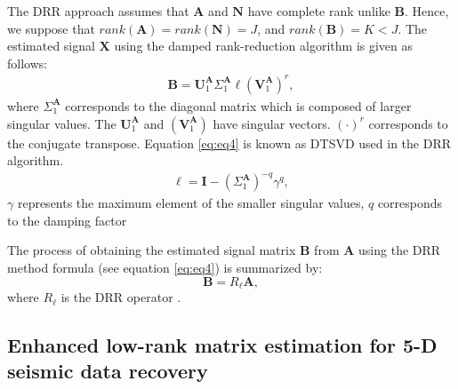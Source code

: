 The DRR approach assumes that $\mathbf{A}$ and $\mathbf{N}$ have complete rank unlike $\mathbf{B}$. Hence, we suppose that $rank(\mathbf{A})=rank(\mathbf{N}) = J$, and $rank(\mathbf{B})= K < J$. The estimated signal $\mathbf{X}$ using the damped rank-reduction algorithm  is given as follows:
\begin{align}
\mathbf{B}=\mathbf{U}^{\mathbf{A}}_1{\Sigma^{\mathbf{A}}_1}\ell\left(\mathbf{V}^{\mathbf{A}}_1\right)^{{r}},
\label{eq:eq4}
\end{align}
where ${\Sigma^{\mathbf{A}}_1}$ corresponds to the diagonal matrix which is composed of larger singular values. The  $\mathbf{U}^{\mathbf{A}}_1$ and $\left(\mathbf{V}^{\mathbf{A}}_1\right)$ have singular vectors. $\left(\cdot\right)^{{r}}$ corresponds to the conjugate transpose. Equation \ref{eq:eq4} is known as DTSVD\dlo{)} used in the DRR algorithm. 
\begin{align}
\ell= \mathbf{I} - (\Sigma^{\mathbf{A}}_1 )^{-{q}}{{\gamma}^{q}},
\label{eq:eq5}
\end{align} 
 ${\gamma}$ represents the maximum element of the smaller singular values, ${q}$ corresponds to the damping factor  

The process of obtaining the estimated signal matrix $\mathbf{B}$ from $\mathbf{A}$ using the DRR method formula (see equation \ref{eq:eq4}) is summarized by:
\begin{equation}
\mathbf{B}={R_\ell}{\mathbf{{A}}}, 
\label{eq:eq6}
\end{equation}
where ${R_\ell}$ is the DRR operator .
 
\subsection{Enhanced low-rank matrix estimation for 5-D seismic data recovery}

